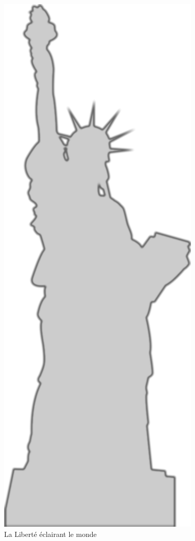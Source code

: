 \begin{figure}
\centering
\includegraphics{images/Liberty.png}
\caption{La Liberté éclairant le monde}
\end{figure}

